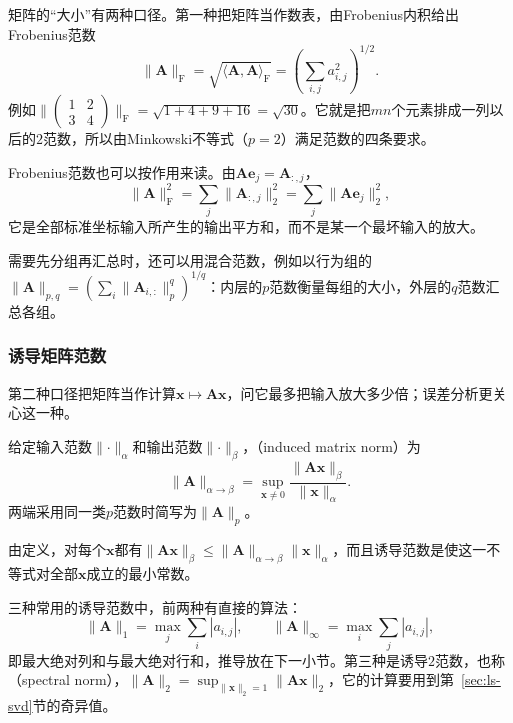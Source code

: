 矩阵的“大小”有两种口径。第一种把矩阵当作数表，由Frobenius内积给出Frobenius范数
\[
 \lVert\bm A\rVert_{\mathrm F}=\sqrt{\langle\bm A,\bm A\rangle_{\mathrm F}}=\left(\sum_{i,j}a_{i,j}^2\right)^{1/2}.
\]
例如$\lVert\left(\begin{smallmatrix}1&2\\3&4\end{smallmatrix}\right)\rVert_{\mathrm F}=\sqrt{1+4+9+16}=\sqrt{30}$。它就是把$mn$个元素排成一列以后的$2$范数，所以由Minkowski不等式（$p=2$）满足范数的四条要求。

Frobenius范数也可以按作用来读。由$\bm A\bm e_j=\bm A_{:,j}$，
\[
 \lVert\bm A\rVert_{\mathrm F}^2=\sum_j\lVert\bm A_{:,j}\rVert_2^2=\sum_j\lVert\bm A\bm e_j\rVert_2^2,
\]
它是全部标准坐标输入所产生的输出平方和，而不是某一个最坏输入的放大。

需要先分组再汇总时，还可以用混合范数，例如以行为组的$\lVert\bm A\rVert_{p,q}=(\sum_i\lVert\bm A_{i,:}\rVert_p^q)^{1/q}$：内层的$p$范数衡量每组的大小，外层的$q$范数汇总各组。

\subsubsection{诱导矩阵范数}
\label{sec:ls-matrix-norms}
\label{sec:ch06-map-comparison}
\label{sec:matrix-analysis-norms-effective-rank}

第二种口径把矩阵当作计算$\bm x\mapsto\bm A\bm x$，问它最多把输入放大多少倍；误差分析更关心这一种。
\begin{definition}[由向量范数诱导的矩阵范数]
\label{def:matrix-analysis-induced-norm}
给定输入范数$\lVert\cdot\rVert_\alpha$和输出范数$\lVert\cdot\rVert_\beta$，（induced matrix norm）为
\[
 \lVert\bm A\rVert_{\alpha\to\beta}
 =\sup_{\bm x\neq0}\frac{\lVert\bm A\bm x\rVert_\beta}{\lVert\bm x\rVert_\alpha}.
\]
两端采用同一类$p$范数时简写为$\lVert\bm A\rVert_p$。
\end{definition}
由定义，对每个$\bm x$都有$\lVert\bm A\bm x\rVert_\beta\leq\lVert\bm A\rVert_{\alpha\to\beta}\lVert\bm x\rVert_\alpha$，而且诱导范数是使这一不等式对全部$\bm x$成立的最小常数。

三种常用的诱导范数中，前两种有直接的算法：
\[
 \lVert\bm A\rVert_1=\max_j\sum_i|a_{i,j}|,\qquad
 \lVert\bm A\rVert_\infty=\max_i\sum_j|a_{i,j}|,
\]
即最大绝对列和与最大绝对行和，推导放在下一小节。第三种是诱导$2$范数，也称（spectral norm），$\lVert\bm A\rVert_2=\sup_{\lVert\bm x\rVert_2=1}\lVert\bm A\bm x\rVert_2$，它的计算要用到第~\ref{sec:ls-svd}节的奇异值。


